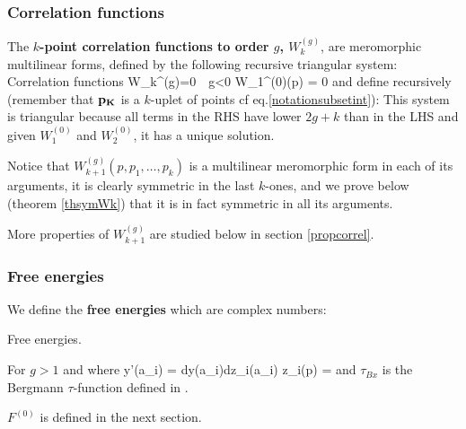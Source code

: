 \subsubsection{Correlation functions}

The {\bf $k$-point correlation functions to order $g$, $W_{k}^{(g)}$}, 
are meromorphic multilinear forms, defined
by the following recursive triangular system:
\bd\label{defloopfctions}
Correlation functions
\beq
W_k^{(g)}=0 \,\, g<0
\eeq
\beq
W_1^{(0)}(p) = 0
\eeq
\beq{}\eeq
and define recursively (remember that ${\bf p_K}$ is a $k$-uplet of points cf eq.\ref{notationsubsetint}):
\beq\label{defWkgrecursive}\eeq
\ed
This system is triangular because all terms in the RHS have lower $2g+k$ than in the LHS and
given $W_1^{(0)}$ and $W_2^{(0)}$, it has a unique solution.


Notice that $W_{k+1}^{(g)}(p,p_1,\dots,p_k)$ is a multilinear meromorphic form in each of its arguments, it is clearly symmetric in the last $k$-ones, and we prove below (theorem \ref{thsymWk}) that it is in fact symmetric in all its arguments.

More properties of $W_{k+1}^{(g)}$ are studied below in section \ref{propcorrel}.

\subsubsection{Free energies}

We define the {\bf free energies} which are complex numbers:

\bd\label{defFg}
Free energies.

For $g>1$
\beq{}\eeq
and
\beq{}\eeq
where
\beq
y'(a_i) = {dy(a_i)\over dz_i(a_i)}
\virg
z_i(p) = 
\eeq
and $\tau_{Bx}$ is the Bergmann $\tau$-function defined in .

$F^{(0)}$ is defined in the next section.

